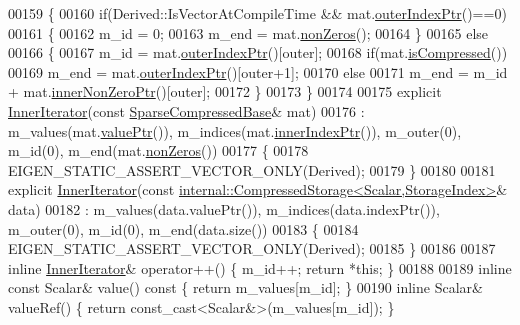 \begin{DoxyCode}
00159     \{
00160       \textcolor{keywordflow}{if}(Derived::IsVectorAtCompileTime && mat.\hyperlink{group___sparse_core___module_a2624d4c2661c582de168246c56e8d71e}{outerIndexPtr}()==0)
00161       \{
00162         m\_id = 0;
00163         m\_end = mat.\hyperlink{group___sparse_core___module_a03de8b3da2c142ce8698a76123b3e7d3}{nonZeros}();
00164       \}
00165       \textcolor{keywordflow}{else}
00166       \{
00167         m\_id = mat.\hyperlink{group___sparse_core___module_a2624d4c2661c582de168246c56e8d71e}{outerIndexPtr}()[outer];
00168         \textcolor{keywordflow}{if}(mat.\hyperlink{group___sparse_core___module_a837934b33a80fe996ff20500373d3a61}{isCompressed}())
00169           m\_end = mat.\hyperlink{group___sparse_core___module_a2624d4c2661c582de168246c56e8d71e}{outerIndexPtr}()[outer+1];
00170         \textcolor{keywordflow}{else}
00171           m\_end = m\_id + mat.\hyperlink{group___sparse_core___module_afc056a3895eae1a4c4767252ff04966a}{innerNonZeroPtr}()[outer];
00172       \}
00173     \}
00174 
00175     \textcolor{keyword}{explicit} \hyperlink{class_eigen_1_1_sparse_compressed_base_1_1_inner_iterator}{InnerIterator}(\textcolor{keyword}{const} \hyperlink{group___sparse_core___module_class_eigen_1_1_sparse_compressed_base}{SparseCompressedBase}& mat)
00176       : m\_values(mat.\hyperlink{group___sparse_core___module_a0f44c739398794ea77f310b745cc5627}{valuePtr}()), m\_indices(mat.\hyperlink{group___sparse_core___module_aa64818e1aa43015dad01b114b2ab4687}{innerIndexPtr}()), m\_outer(0), m\_id(0),
       m\_end(mat.\hyperlink{group___sparse_core___module_a03de8b3da2c142ce8698a76123b3e7d3}{nonZeros}())
00177     \{
00178       EIGEN\_STATIC\_ASSERT\_VECTOR\_ONLY(Derived);
00179     \}
00180 
00181     \textcolor{keyword}{explicit} \hyperlink{class_eigen_1_1_sparse_compressed_base_1_1_inner_iterator}{InnerIterator}(\textcolor{keyword}{const} 
      \hyperlink{class_eigen_1_1internal_1_1_compressed_storage}{internal::CompressedStorage<Scalar,StorageIndex>}& data)
00182       : m\_values(data.valuePtr()), m\_indices(data.indexPtr()), m\_outer(0), m\_id(0), m\_end(data.size())
00183     \{
00184       EIGEN\_STATIC\_ASSERT\_VECTOR\_ONLY(Derived);
00185     \}
00186 
00187     \textcolor{keyword}{inline} \hyperlink{class_eigen_1_1_sparse_compressed_base_1_1_inner_iterator}{InnerIterator}& operator++() \{ m\_id++; \textcolor{keywordflow}{return} *\textcolor{keyword}{this}; \}
00188 
00189     \textcolor{keyword}{inline} \textcolor{keyword}{const} Scalar& value()\textcolor{keyword}{ const }\{ \textcolor{keywordflow}{return} m\_values[m\_id]; \}
00190     \textcolor{keyword}{inline} Scalar& valueRef() \{ \textcolor{keywordflow}{return} \textcolor{keyword}{const\_cast<}Scalar&\textcolor{keyword}{>}(m\_values[m\_id]); \}

\end{DoxyCode}
